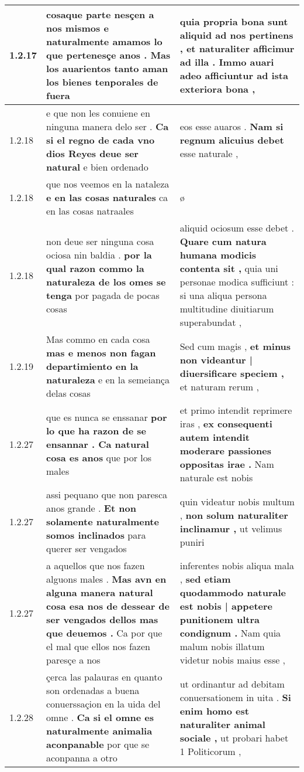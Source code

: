 \begin{tabular}{|p{1cm}|p{6.5cm}|p{6.5cm}|}
1.2.17 & cosaque parte nesçen a nos mismos \textbf{ e naturalmente amamos lo que pertenesçe anos . } Mas los auarientos tanto aman los bienes tenporales de fuera & quia propria bona sunt aliquid ad nos pertinens , \textbf{ et naturaliter afficimur ad illa . Immo auari adeo afficiuntur } ad ista exteriora bona , \\\hline
1.2.18 & e que non les conuiene en ninguna manera delo ser . \textbf{ Ca si el regno de cada vno dios Reyes deue ser natural } e bien ordenado & eos esse auaros . \textbf{ Nam si regnum alicuius debet } esse naturale , \\\hline
1.2.18 & que nos veemos en la nataleza \textbf{ e en las cosas naturales } ca en las cosas natraales & ø \\\hline
1.2.18 & non deue ser ninguna cosa ociosa nin baldia . \textbf{ por la qual razon commo la naturaleza de los omes se tenga } por pagada de pocas cosas & aliquid ociosum esse debet . \textbf{ Quare cum natura humana modicis contenta sit , } quia uni personae modica sufficiunt : si una aliqua persona multitudine diuitiarum superabundat , \\\hline
1.2.19 & Mas commo en cada cosa \textbf{ mas e menos non fagan departimiento en la naturaleza } e en la semeiança delas cosas & Sed cum magis , \textbf{ et minus non videantur | diuersificare speciem , } et naturam rerum , \\\hline
1.2.27 & que es nunca se enssanar \textbf{ por lo que ha razon de se ensannar . Ca natural cosa es anos } que por los males & et primo intendit reprimere iras , \textbf{ ex consequenti autem intendit moderare passiones oppositas irae . } Nam naturale est nobis \\\hline
1.2.27 & assi pequano que non paresca anos grande . \textbf{ Et non solamente naturalmente somos inclinados } para querer ser vengados & quin videatur nobis multum , \textbf{ non solum naturaliter inclinamur , } ut velimus puniri \\\hline
1.2.27 & a aquellos que nos fazen alguons males . \textbf{ Mas avn en alguna manera natural cosa esa nos de dessear de ser vengados dellos mas que deuemos . } Ca por que el mal que ellos nos fazen paresçe a nos & inferentes nobis aliqua mala , \textbf{ sed etiam quodammodo naturale est nobis | appetere punitionem ultra condignum . } Nam quia malum nobis illatum videtur nobis maius esse , \\\hline
1.2.28 & çerca las palauras en quanto son ordenadas a buena conuerssaçion en la uida del omne . \textbf{ Ca si el omne es naturalmente animalia aconpanable } por que se aconpanna a otro & ut ordinantur ad debitam conuersationem in uita . \textbf{ Si enim homo est naturaliter animal sociale , } ut probari habet 1 Politicorum , \\\hline

\end{tabular}
